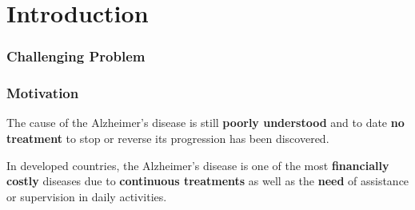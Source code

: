 \section{Introduction}

\begin{frame}
	\frametitle{Challenging Problem}
	
	\vspace{0.6cm}
	
	\begin{center}
	\end{center}
\end{frame}

\begin{frame}
	\frametitle{Motivation}
	
	\Large
	
	\vspace{0.2cm}
	
	The cause of the Alzheimer's disease is still \textbf{poorly understood} and to date \textbf{no
	treatment} to stop or reverse its progression has been discovered.
	
	\vspace{0.5cm}
	
	In developed countries, the Alzheimer's disease is one of the most \textbf{financially costly}
	diseases due to \textbf{continuous treatments} as well as the \textbf{need} of assistance or
	supervision in daily activities.
\end{frame}

